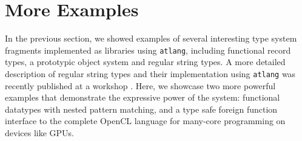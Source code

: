 \documentclass[9pt]{sigplanconf}
\newcommand{\lstinlinep}[1]{\lstinline[language=Python,basicstyle=\ttfamily\small,deletendkeywords={tuple,buffer,map}]{#1}}
\begin{document}


\section{More Examples}\label{examples}
In the previous section, we showed examples of several interesting type system fragments implemented as libraries using \lstinlinep{atlang}, including functional record types, a prototypic object system and regular string types. A more detailed description of regular string types and their implementation using \lstinlinep{atlang} was recently published at a workshop \cite{sanitation-psp14}. Here, we showcase two more powerful examples that demonstrate the expressive power of the system: functional datatypes with nested pattern matching, and a type safe foreign function interface to the complete OpenCL language for many-core programming on devices like GPUs.
\end{document}
